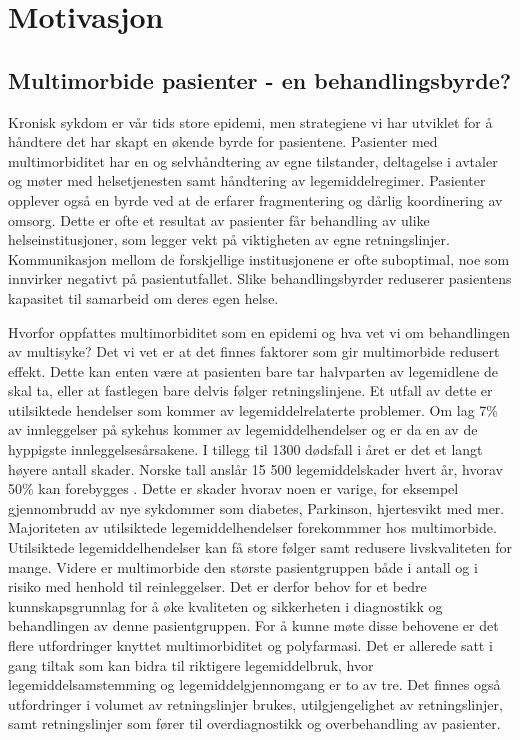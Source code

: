 \section{Motivasjon}
\subsection{Multimorbide pasienter - en behandlingsbyrde?}
Kronisk sykdom er vår tids store epidemi, men strategiene vi har utviklet for å håndtere det har skapt en økende byrde for pasientene. Pasienter med multimorbiditet har en  og selvhåndtering av egne tilstander, deltagelse i avtaler og møter med helsetjenesten samt håndtering av legemiddelregimer.\citep{min_disruptie_medicine} Pasienter opplever også en byrde ved at de erfarer fragmentering og dårlig koordinering av omsorg. Dette er ofte et resultat av pasienter får behandling av ulike helseinstitusjoner, som legger vekt på viktigheten av egne retningslinjer. Kommunikasjon mellom de forskjellige institusjonene er ofte suboptimal, noe som innvirker negativt på pasientutfallet. \citep{GPS_perspective_multimor} Slike behandlingsbyrder reduserer pasientens kapasitet til samarbeid om deres egen helse.

Hvorfor oppfattes multimorbiditet som en epidemi og hva vet vi om behandlingen av multisyke? Det vi vet er at det finnes faktorer som gir multimorbide redusert effekt. Dette kan enten være at pasienten bare tar halvparten av legemidlene de skal ta, eller at fastlegen bare delvis følger retningslinjene. Et utfall av dette er utilsiktede hendelser som kommer av legemiddelrelaterte problemer. Om lag 7\% av innleggelser på sykehus kommer av legemiddelhendelser og er da en av de hyppigste innleggelsesårsakene. I tillegg til 1300 dødsfall i året er det et langt høyere antall skader. \citep{anders_grimsmo} Norske tall anslår 15 500 legemiddelskader hvert år, hvorav 50\% kan forebygges \citep{kvalitetogprioritering_multisyke}. Dette er skader hvorav noen er varige, for eksempel gjennombrudd av nye sykdommer som diabetes, Parkinson, hjertesvikt med mer\citep{anders_grimsmo}.
Majoriteten av utilsiktede legemiddelhendelser forekommmer hos multimorbide. Utilsiktede legemiddelhendelser kan få store følger samt redusere livskvaliteten for mange. Videre er multimorbide den største pasientgruppen både i antall og i risiko med henhold til reinleggelser. Det er derfor behov for et bedre kunnskapsgrunnlag for å øke kvaliteten og sikkerheten i diagnostikk og behandlingen av denne pasientgruppen. For å kunne møte disse behovene er det flere utfordringer knyttet multimorbiditet og polyfarmasi. Det er allerede satt i gang tiltak som kan bidra til riktigere legemiddelbruk, hvor legemiddelsamstemming og legemiddelgjennomgang er to av tre. Det finnes også utfordringer i volumet av retningslinjer brukes, utilgjengelighet av retningslinjer, samt retningslinjer som fører til overdiagnostikk og overbehandling av pasienter.
